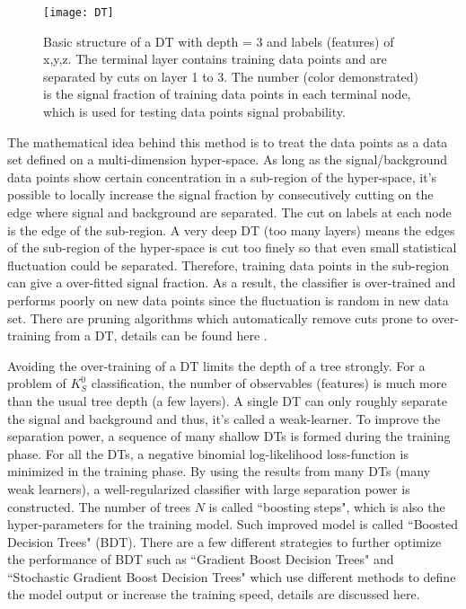 \begin{figure}[htpb]
	\centering 
	\texttt{[image: DT]}
	\caption{Basic structure of a DT with depth = 3 and labels (features) of x,y,z. The terminal layer contains training data points and are separated by cuts on layer 1 to 3. The number (color demonstrated) is the signal fraction of training data points in each terminal node, which is used for testing data points signal probability.}
	\label{fig:DT}
\end{figure}

The mathematical idea behind this method is to treat the data points as a data set defined on a multi-dimension hyper-space. As long as the signal/background data points show certain concentration in a sub-region of the hyper-space, it's possible to locally increase the signal fraction by consecutively cutting on the edge where signal and background are separated. The cut on labels at each node is the edge of the sub-region. A very deep DT (too many layers) means the edges of the sub-region of the hyper-space is cut too finely so that even small statistical fluctuation could be separated. Therefore, training data points in the sub-region can give a over-fitted signal fraction. As a result, the classifier is over-trained and performs poorly on new data points since the fluctuation is random in new data set. There are pruning algorithms which automatically remove cuts prone to over-training
from a DT, details can be found here \cite{olshen1984classification}.

Avoiding the over-training of a DT limits the depth of a tree strongly. For a problem of $K_S^0$ classification, the number of observables (features) is much more than the usual tree depth (a few layers). A single DT can only roughly separate the signal and background and thus, it's called a weak-learner. To improve the separation power, a sequence of many shallow DTs is formed during the training phase. For all the DTs, a negative binomial log-likelihood loss-function is minimized in the training phase. By using the results from many DTs (many weak learners), a well-regularized classifier with large separation power is constructed. The number of trees $N$ is called ``boosting steps", which is also the hyper-parameters for the training model. Such improved model is called ``Boosted Decision Trees" (BDT). There are a few different strategies to further optimize the performance of BDT such as ``Gradient Boost Decision Trees" and ``Stochastic Gradient Boost Decision Trees" which use different methods to define the model output or increase the training speed, details are discussed here\cite{friedman2002stochastic}.

